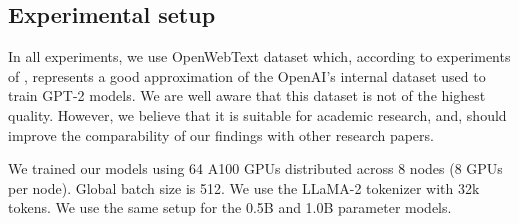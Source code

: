 \documentclass{article} %
\begin{document}
\subsection{Experimental setup}
\label{appendix:expsetup}

In all experiments, we use OpenWebText \citep{Gokaslan2019OpenWeb} dataset which, according to experiments of \cite{karpathy2023nanogpt},  represents a good approximation of the OpenAI's internal dataset used to train GPT-2 models. We are well aware that this dataset is not of the highest quality. However, we believe that it is suitable for academic research, and, should improve the comparability of our findings with other research papers. 

We trained our models using 64 A100 GPUs distributed across 8 nodes (8 GPUs per node).  Global batch size is 512. We use the LLaMA-2 tokenizer  with 32k tokens. We use the same setup for the 0.5B and 1.0B parameter models. 


\begin{table}[t]
\caption{Model Parameters for GPT and nGPT}
\centering
{}
\label{table_model_params}
\end{table}
\end{document}
